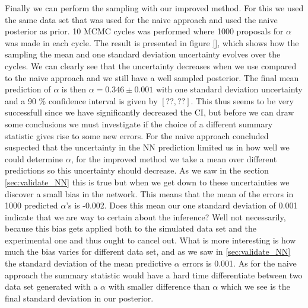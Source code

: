 \documentclass[11pt,a4paper]{article}
\begin{document}
Finally we can perform the sampling with our improved method. For this we used the same data set that was used for the naive approach and used the naive posterior as prior. 10 MCMC cycles was performed where 1000 proposals for $\alpha$ was made in each cycle. The result is presented in figure \ref{}, which shows how the sampling the mean and one standard deviation uncertainty evolves
over the cycles. We can clearly see that the uncertainty decreases when we use compared to the naive approach and we still have a well sampled posterior. The final mean prediction of $\alpha$ is then $\alpha = 0.346 \pm 0.001$ with one standard deviation uncertainty and a 90 \% confidence interval is given by $[??, ??]$. This thus seems to be very successfull since we have significantly decreased the CI, but before we can draw some conclusions we must investigate if the choice of a different summary statistic gives rise to some new errors. For the naive approach concluded suspected that the uncertainty in the NN prediction limited us in how well we could determine $\alpha$, for the improved method we take a mean over different predictions so this uncertainty should decrease. As we saw in the section \ref{sec:validate_NN} this is true but when we get down to these uncertainties we discover a small bias in the network. This means that the mean of the errors in 1000 predicted $\alpha$'s is -0.002. Does this mean our one standard deviation of 0.001 indicate that we are way to certain about the inference? Well not necessarily, because this bias gets applied both to the simulated data set and the experimental one and thus ought to cancel out. What is more interesting is how much the bias varies for different data set, and as we saw in \ref{sec:validate_NN} the standard deviation of the mean predictive $\alpha$ errors is 0.001. As for the naive approach the summary statistic would have a hard time differentiate between two data set generated with a $\alpha$ with smaller difference than $\alpha$ which we see is the final standard deviation in our posterior. 







\printbibliography
\end{document}
